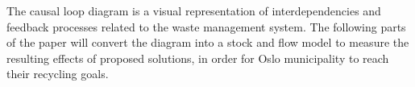 \indent \newline
The causal loop diagram is a visual representation of interdependencies and feedback processes related to the waste management system. The following parts of the paper will convert the diagram into a stock and flow model to measure the resulting effects of proposed solutions, in order for Oslo municipality to reach their recycling goals.
